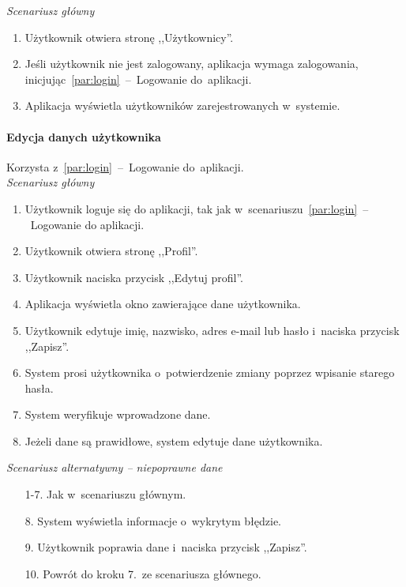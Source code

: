 \textit{Scenariusz główny}

\begin{enumerate}
\item Użytkownik otwiera stronę ,,Użytkownicy''.
\item Jeśli użytkownik nie jest zalogowany, aplikacja wymaga zalogowania, inicjując~\ref{par:login}~--~Logowanie do~aplikacji.
\item Aplikacja wyświetla użytkowników zarejestrowanych w~systemie.
\end{enumerate}

\paragraph{Edycja danych użytkownika\newline}
\label{par:editUser}
Korzysta z~\ref{par:login}~--~Logowanie do~aplikacji.\\

\textit{Scenariusz główny}

\begin{enumerate}
\item Użytkownik loguje się do aplikacji, tak jak w~scenariuszu~\ref{par:login}~--~Logowanie do aplikacji.
\item Użytkownik otwiera stronę ,,Profil''.
\item Użytkownik naciska przycisk ,,Edytuj profil''.
\item Aplikacja wyświetla okno zawierające dane użytkownika.
\item Użytkownik edytuje imię, nazwisko, adres e-mail lub hasło i~naciska przycisk ,,Zapisz''.
\item System prosi użytkownika o~potwierdzenie zmiany poprzez wpisanie starego hasła.
\item System weryfikuje wprowadzone dane.
\item Jeżeli dane są prawidłowe, system edytuje dane użytkownika.
\end{enumerate}

\textit{Scenariusz alternatywny -- niepoprawne dane}

\begin{enumerate}
\item[1-7.] Jak w~scenariuszu głównym.
\item[8.] System wyświetla informacje o~wykrytym błędzie.
\item[9.] Użytkownik poprawia dane i~naciska przycisk ,,Zapisz''.
\item[10.] Powrót do kroku 7.~ze scenariusza głównego.
\end{enumerate}

